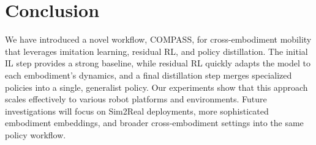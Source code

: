 \documentclass[letterpaper, 10 pt,conference]{ieeeconf}
\begin{document}
\section{Conclusion}
\label{sec:conclusion}

We have introduced a novel workflow, COMPASS, for cross-embodiment mobility that leverages imitation learning, residual RL, and policy distillation. The initial IL step provides a strong baseline, while residual RL quickly adapts the model to each embodiment's dynamics, and a final distillation step merges specialized policies into a single, generalist policy. Our experiments show that this approach scales effectively to various robot platforms and environments. Future investigations will focus on Sim2Real deployments, more sophisticated embodiment embeddings, and broader cross-embodiment settings into the same policy workflow.




\end{document}
